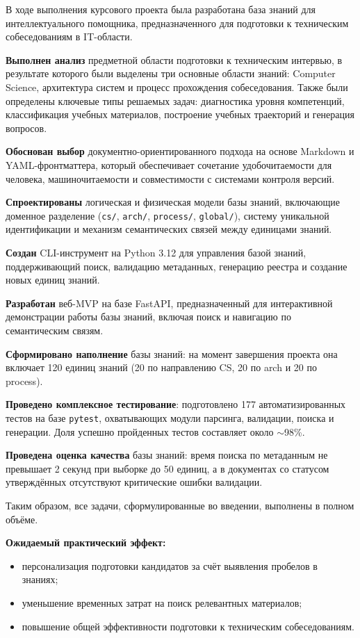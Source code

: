 
В ходе выполнения курсового проекта была разработана база знаний для интеллектуального помощника, предназначенного для подготовки к техническим собеседованиям в IT-области.

\textbf{Выполнен анализ} предметной области подготовки к техническим интервью, в результате которого были выделены три основные области знаний: Computer Science, архитектура систем и процесс прохождения собеседования. Также были определены ключевые типы решаемых задач: диагностика уровня компетенций, классификация учебных материалов, построение учебных траекторий и генерация вопросов.

\textbf{Обоснован выбор} документно-ориентированного подхода на основе Markdown и YAML-фронтматтера, который обеспечивает сочетание удобочитаемости для человека, машиночитаемости и совместимости с системами контроля версий.

\textbf{Спроектированы} логическая и физическая модели базы знаний, включающие доменное разделение (\texttt{cs/}, \texttt{arch/}, \texttt{process/}, \texttt{global/}), систему уникальной идентификации и механизм семантических связей между единицами знаний.

\textbf{Создан} CLI-инструмент на Python 3.12 для управления базой знаний, поддерживающий поиск, валидацию метаданных, генерацию реестра и создание новых единиц знаний.

\textbf{Разработан} веб-MVP на базе FastAPI, предназначенный для интерактивной демонстрации работы базы знаний, включая поиск и навигацию по семантическим связям.

\textbf{Сформировано наполнение} базы знаний: на момент завершения проекта она включает 120 единиц знаний (20 по направлению CS, 20 по arch и 20 по process).

\textbf{Проведено комплексное тестирование}: подготовлено 177 автоматизированных тестов на базе \texttt{pytest}, охватывающих модули парсинга, валидации, поиска и генерации. Доля успешно пройденных тестов составляет около $\sim$98\%.

\textbf{Проведена оценка качества} базы знаний: время поиска по метаданным не превышает 2 секунд при выборке до 50 единиц, а в документах со статусом утверждённых отсутствуют критические ошибки валидации.

Таким образом, все задачи, сформулированные во введении, выполнены в полном объёме.

\textbf{Ожидаемый практический эффект:}
\begin{itemize}
    \item персонализация подготовки кандидатов за счёт выявления пробелов в знаниях;
    \item уменьшение временных затрат на поиск релевантных материалов;
    \item повышение общей эффективности подготовки к техническим собеседованиям.
\end{itemize}

